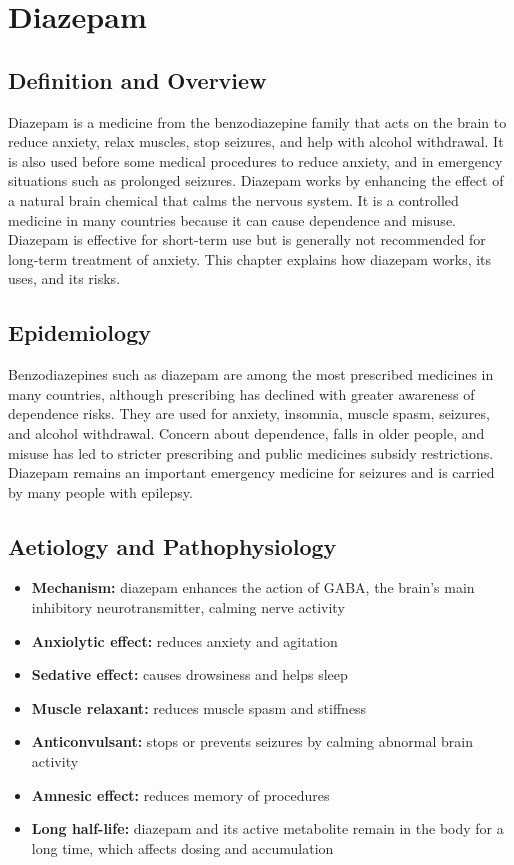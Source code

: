 \chapter{Diazepam}

\section*{Definition and Overview}
Diazepam is a medicine from the benzodiazepine family that acts on the brain to reduce anxiety, relax muscles, stop seizures, and help with alcohol withdrawal. It is also used before some medical procedures to reduce anxiety, and in emergency situations such as prolonged seizures. Diazepam works by enhancing the effect of a natural brain chemical that calms the nervous system. It is a controlled medicine in many countries because it can cause dependence and misuse. Diazepam is effective for short-term use but is generally not recommended for long-term treatment of anxiety. This chapter explains how diazepam works, its uses, and its risks.

\section*{Epidemiology}
Benzodiazepines such as diazepam are among the most prescribed medicines in many countries, although prescribing has declined with greater awareness of dependence risks. They are used for anxiety, insomnia, muscle spasm, seizures, and alcohol withdrawal. Concern about dependence, falls in older people, and misuse has led to stricter prescribing and public medicines subsidy restrictions. Diazepam remains an important emergency medicine for seizures and is carried by many people with epilepsy.

\section*{Aetiology and Pathophysiology}
\begin{itemize}
    \item \textbf{Mechanism:} diazepam enhances the action of GABA, the brain's main inhibitory neurotransmitter, calming nerve activity
    \item \textbf{Anxiolytic effect:} reduces anxiety and agitation
    \item \textbf{Sedative effect:} causes drowsiness and helps sleep
    \item \textbf{Muscle relaxant:} reduces muscle spasm and stiffness
    \item \textbf{Anticonvulsant:} stops or prevents seizures by calming abnormal brain activity
    \item \textbf{Amnesic effect:} reduces memory of procedures
    \item \textbf{Long half-life:} diazepam and its active metabolite remain in the body for a long time, which affects dosing and accumulation
\end{itemize}

